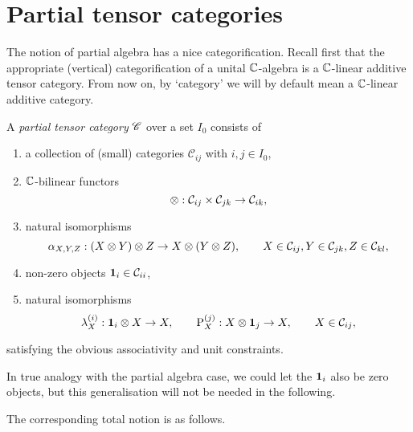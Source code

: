 \section{Partial tensor categories}


The notion of partial algebra has a nice categorification. %
Recall first that the appropriate (vertical) categorification of a unital $\mathbb{C}$-algebra is a $\mathbb{C}$-linear additive tensor category. From now on, by `category' we will by default mean a $\mathbb{C}$-linear additive category. 

\begin{Def} A \emph{partial tensor category} $\mathscr{C}$ over a set $I_0$ consists of 
\begin{enumerate}[label=(\alph*)]
\item a collection of (small) categories $\mathcal{C}_{ij}$ with $i,j\in I_0$, 
\item $\mathbb{C}$-bilinear functors \[\otimes: \mathcal{C}_{ij}\times \mathcal{C}_{jk}\rightarrow \mathcal{C}_{ik},\] 
\item natural isomorphisms \[ \alpha_{X,Y,Z}: (X\otimes Y)\otimes Z \rightarrow X\otimes (Y\otimes Z),\qquad X \in \mathcal{C}_{ij},Y\in \mathcal{C}_{jk},Z\in \mathcal{C}_{kl},\] 
\item non-zero objects $\mathbf{1}_{i} \in \mathcal{C}_{ii}$,
\item natural isomorphisms \[\lambda_X^{(i)}:\mathbf{1}_i\otimes X \rightarrow X,\qquad \mathrm{P}_X^{(j)}:X\otimes \mathbf{1}_j\rightarrow X, \qquad X\in \mathcal{C}_{ij},\]
\end{enumerate}
satisfying the obvious associativity and unit constraints. 
\end{Def}

\begin{Rem} In true analogy with the partial algebra case, we could let the $\mathbf{1}_i$ also be zero objects, but this generalisation will not be needed in the following. 
\end{Rem}

The corresponding total notion is as follows. 

